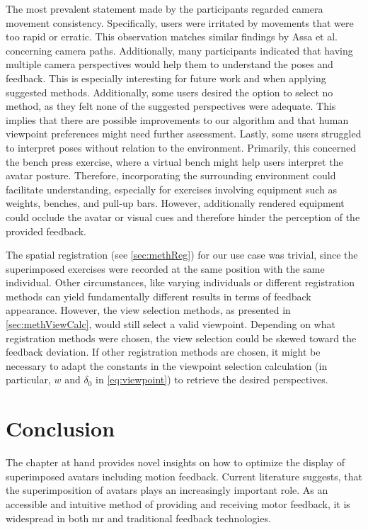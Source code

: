The most prevalent statement made by the participants regarded camera movement consistency. Specifically, users were irritated by movements that were too rapid or erratic. This observation matches similar findings by Assa et al.~\cite{assa2008moh} concerning camera paths. Additionally, many participants indicated that having multiple camera perspectives would help them to understand the poses and feedback. This is especially interesting for future work and when applying suggested methods. Additionally, some users desired the option to select no method, as they felt none of the suggested perspectives were adequate. This implies that there are possible improvements to our algorithm and that human viewpoint preferences might need further assessment. Lastly, some users struggled to interpret poses without relation to the environment. Primarily, this concerned the bench press exercise, where a virtual bench might help users interpret the avatar posture. Therefore, incorporating the surrounding environment could facilitate understanding, especially for exercises involving equipment such as weights, benches, and pull-up bars. However, additionally rendered equipment could occlude the avatar or visual cues and therefore hinder the perception of the provided feedback.

The spatial registration (see \autoref{sec:methReg}) for our use case was trivial, since the superimposed exercises were recorded at the same position with the same individual. Other circumstances, like varying individuals or different registration methods can yield fundamentally different results in terms of feedback appearance. However, the view selection methods, as presented in \autoref{sec:methViewCalc}, would still select a valid viewpoint. Depending on what registration methods were chosen, the view selection could be skewed toward the feedback deviation. If other registration methods are chosen, it might be necessary to adapt the constants in the viewpoint selection calculation (in particular, $w$ and $\delta_0$ in \autoref{eq:viewpoint}) to retrieve the desired perspectives.

\section{Conclusion}
The chapter at hand provides novel insights on how to optimize the display of superimposed avatars including motion feedback. Current literature suggests, that the superimposition of avatars plays an increasingly important role. As an accessible and intuitive method of providing and receiving motor feedback, it is widespread in both \acrshort{mr} and traditional feedback technologies.

